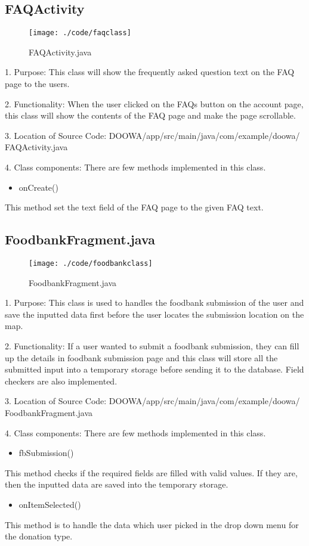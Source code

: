 \documentclass[conference]{IEEEtran}
\begin{document}
\subsection{FAQActivity}
\begin{figure}[h!]
\texttt{[image: ./code/faqclass]}
\centering
\caption{FAQActivity.java}
\end{figure}
1. Purpose: This class will show the frequently asked question text on the FAQ page to the users.\break
\par 2. Functionality: When the user clicked on the FAQs button on the account page, this class will show the contents of the FAQ page and make the page scrollable.\break

3. Location of Source Code: DOOWA/app/src/main/java/com/example/doowa/ FAQActivity.java\break

4. Class components: There are few methods implemented in this class.
\begin{itemize}
\item onCreate()
\end{itemize}
This method set the text field of the FAQ page to the given FAQ text.
\break

\subsection{FoodbankFragment.java}
\begin{figure}[h!]
\texttt{[image: ./code/foodbankclass]}
\centering
\caption{FoodbankFragment.java}
\end{figure}
1. Purpose: This class is used to handles the foodbank submission of the user and save the inputted data first before the user locates the submission location on the map.\break
\par 2. Functionality: If a user wanted to submit a foodbank submission, they can fill up the details in foodbank submission page and this class will store all the submitted input into a temporary storage before sending it to the database. Field checkers are also implemented.\break

3. Location of Source Code: DOOWA/app/src/main/java/com/example/doowa/ FoodbankFragment.java\break

4. Class components: There are few methods implemented in this class.
\begin{itemize}
\item fbSubmission()
\end{itemize}
This method checks if the required fields are filled with valid values. If they are, then the inputted data are saved into the temporary storage. 
\begin{itemize}
\item onItemSelected()
\end{itemize}
This method is to handle the data which user picked in the drop down menu for the donation type.
\break
\end{document}
